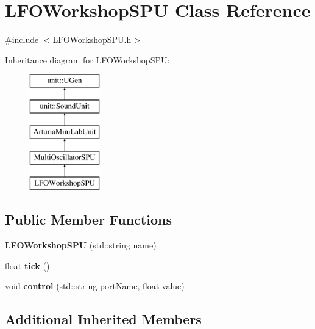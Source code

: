 \hypertarget{classLFOWorkshopSPU}{\section{L\-F\-O\-Workshop\-S\-P\-U Class Reference}
\label{classLFOWorkshopSPU}
}


{\ttfamily \#include $<$L\-F\-O\-Workshop\-S\-P\-U.\-h$>$}

Inheritance diagram for L\-F\-O\-Workshop\-S\-P\-U\-:\begin{figure}[H]
\begin{center}
\leavevmode
\includegraphics[height=5.000000cm]{classLFOWorkshopSPU}
\end{center}
\end{figure}
\subsection*{Public Member Functions}
\begin{DoxyCompactItemize}
\item 
\hypertarget{classLFOWorkshopSPU_af0da7426287c75e69999066976565005}{{\bfseries L\-F\-O\-Workshop\-S\-P\-U} (std\-::string name)}\label{classLFOWorkshopSPU_af0da7426287c75e69999066976565005}

\item 
\hypertarget{classLFOWorkshopSPU_a0af8aaed492cecf1b6d3bf416393a8d1}{float {\bfseries tick} ()}\label{classLFOWorkshopSPU_a0af8aaed492cecf1b6d3bf416393a8d1}

\item 
\hypertarget{classLFOWorkshopSPU_a3c139a87ec2ec0c9cfa149f7652b11f8}{void {\bfseries control} (std\-::string port\-Name, float value)}\label{classLFOWorkshopSPU_a3c139a87ec2ec0c9cfa149f7652b11f8}

\end{DoxyCompactItemize}
\subsection*{Additional Inherited Members}


